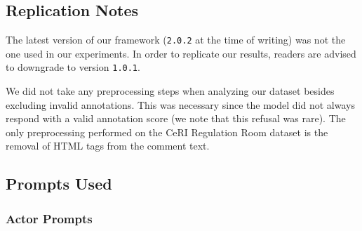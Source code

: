 \subsection{Replication Notes}

The latest version of our framework (\texttt{2.0.2} at the time of writing) was not the one used in our experiments. In order to replicate our results, readers are advised to downgrade to version \texttt{1.0.1}.

We did not take any preprocessing steps when analyzing our dataset besides excluding invalid annotations. This was necessary since the model did not always respond with a valid annotation score (we note that this refusal was rare). The only preprocessing performed on the CeRI Regulation Room dataset is the removal of HTML tags from the comment text.

\subsection{Prompts Used}
\label{ssec:appendix:prompts}
    
\subsubsection{Actor Prompts}
\label{sssec:appendix:actors}

